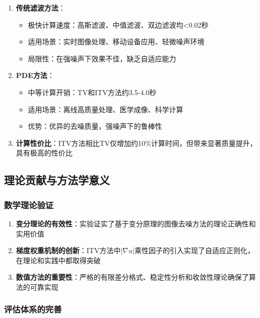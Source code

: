 \documentclass[a4paper,12pt]{ctexart}
\begin{document}
\begin{enumerate}
    \item \textbf{传统滤波方法}：
    \begin{itemize}
        \item 极快计算速度：高斯滤波、中值滤波、双边滤波均<0.02秒
        \item 适用场景：实时图像处理、移动设备应用、轻微噪声环境
        \item 局限性：在强噪声下效果不佳，缺乏自适应能力
    \end{itemize}

    \item \textbf{PDE方法}：
    \begin{itemize}
        \item 中等计算开销：TV和ITV方法约3.5-4.0秒
        \item 适用场景：离线高质量处理、医学成像、科学计算
        \item 优势：优异的去噪质量，强噪声下的鲁棒性
    \end{itemize}

    \item \textbf{计算性价比}：ITV方法相比TV仅增加约10\%计算时间，但带来显著质量提升，具有极高的性价比
\end{enumerate}

\subsection{理论贡献与方法学意义}

\subsubsection{数学理论验证}

\begin{enumerate}
    \item \textbf{变分理论的有效性}：实验证实了基于变分原理的图像去噪方法的理论正确性和实用价值

    \item \textbf{梯度权重机制的创新}：ITV方法中$|\nabla u|$乘性因子的引入实现了自适应正则化，在理论和实践中都取得突破

    \item \textbf{数值方法的重要性}：严格的有限差分格式、稳定性分析和收敛性理论确保了算法的可靠实现
\end{enumerate}

\subsubsection{评估体系的完善}
\end{document}

